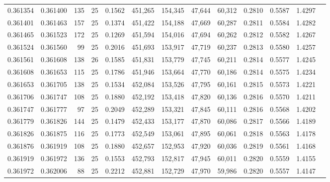 \begin{tabular}{rrrrrrrrrrrrr}
0.361354 & 0.361400 &   135 &  25 &                                     0.1562 & 451,265 & 154,345 &  47,644 &  60,312 & 0.2810 & 0.5587 & 1.4297 \\
0.361401 & 0.361463 &   157 &  25 &                                     0.1374 & 451,422 & 154,188 &  47,669 &  60,287 & 0.2811 & 0.5584 & 1.4282 \\
0.361465 & 0.361523 &   172 &  25 &                                     0.1269 & 451,594 & 154,016 &  47,694 &  60,262 & 0.2812 & 0.5582 & 1.4267 \\
0.361524 & 0.361560 &    99 &  25 &                                     0.2016 & 451,693 & 153,917 &  47,719 &  60,237 & 0.2813 & 0.5580 & 1.4257 \\
0.361561 & 0.361608 &   138 &  26 &                                     0.1585 & 451,831 & 153,779 &  47,745 &  60,211 & 0.2814 & 0.5577 & 1.4245 \\
0.361608 & 0.361653 &   115 &  25 &                                     0.1786 & 451,946 & 153,664 &  47,770 &  60,186 & 0.2814 & 0.5575 & 1.4234 \\
0.361653 & 0.361705 &   138 &  25 &                                     0.1534 & 452,084 & 153,526 &  47,795 &  60,161 & 0.2815 & 0.5573 & 1.4221 \\
0.361706 & 0.361747 &   108 &  25 &                                     0.1880 & 452,192 & 153,418 &  47,820 &  60,136 & 0.2816 & 0.5570 & 1.4211 \\
0.361747 & 0.361777 &    97 &  25 &                                     0.2049 & 452,289 & 153,321 &  47,845 &  60,111 & 0.2816 & 0.5568 & 1.4202 \\
0.361779 & 0.361826 &   144 &  25 &                                     0.1479 & 452,433 & 153,177 &  47,870 &  60,086 & 0.2817 & 0.5566 & 1.4189 \\
0.361826 & 0.361875 &   116 &  25 &                                     0.1773 & 452,549 & 153,061 &  47,895 &  60,061 & 0.2818 & 0.5563 & 1.4178 \\
0.361876 & 0.361919 &   108 &  25 &                                     0.1880 & 452,657 & 152,953 &  47,920 &  60,036 & 0.2819 & 0.5561 & 1.4168 \\
0.361919 & 0.361972 &   136 &  25 &                                     0.1553 & 452,793 & 152,817 &  47,945 &  60,011 & 0.2820 & 0.5559 & 1.4155 \\
0.361972 & 0.362006 &    88 &  25 &                                     0.2212 & 452,881 & 152,729 &  47,970 &  59,986 & 0.2820 & 0.5557 & 1.4147 \\

\end{tabular}

